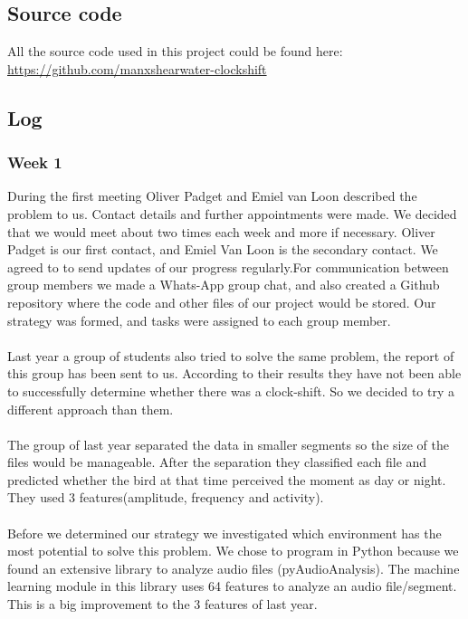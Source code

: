 \documentclass[a4paper]{article}
\begin{document}
\subsection*{Source code}
All the source code used in this project could be found here: \\
\url{https://github.com/manxshearwater-clockshift}
\subsection*{Log}
\subsubsection*{Week 1}
During the first meeting Oliver Padget and Emiel van Loon described the problem to us. Contact details and further appointments were made. We decided that we would meet about two times each week and more if necessary. Oliver Padget is our first contact, and Emiel Van Loon is the secondary contact. We agreed to to send updates of our progress regularly.For communication between group members we made a Whats-App group chat, and also created a Github repository where the code and other files of our project would be stored. Our strategy was formed, and tasks were assigned to each group member.\\\\
Last year a group of students also tried to solve the same problem, the report of this group has been sent to us. According to their results they have not been able to successfully determine whether there was a clock-shift. So we decided to try a different approach than them.
\\\\
The group of last year separated the data in smaller segments so the size of the files would be manageable. After the separation they classified each file and predicted whether the bird at that time perceived the moment as day or night. They used 3 features(amplitude, frequency and activity).\\\\
Before we determined our strategy we investigated which environment has the most potential to solve this problem. We chose to program in Python because we found an extensive library to analyze audio files (pyAudioAnalysis). The machine learning module in this library uses 64 features to analyze an audio file/segment. This is a big improvement to the 3 features of last year.\\\\
\end{document}
